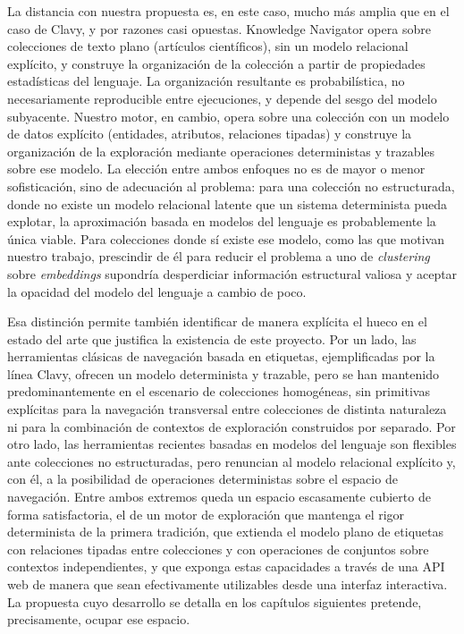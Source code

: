 La distancia con nuestra propuesta es, en este caso, mucho más amplia que en el caso de Clavy, y por
razones casi opuestas. Knowledge Navigator opera sobre colecciones de texto plano (artículos científicos),
sin un modelo relacional explícito, y construye la organización de la colección a partir de propiedades
estadísticas del lenguaje. La organización resultante es probabilística, no necesariamente reproducible
entre ejecuciones, y depende del sesgo del modelo subyacente. Nuestro motor, en cambio, opera sobre
una colección con un modelo de datos explícito (entidades, atributos, relaciones tipadas) y construye la
organización de la exploración mediante operaciones deterministas y trazables sobre ese modelo. La
elección entre ambos enfoques no es de mayor o menor sofisticación, sino de adecuación al problema:
para una colección no estructurada, donde no existe un modelo relacional latente que un sistema
determinista pueda explotar, la aproximación basada en modelos del lenguaje es probablemente la única
viable. Para colecciones donde sí existe ese modelo, como las que motivan nuestro trabajo, prescindir
de él para reducir el problema a uno de \textit{clustering} sobre \textit{embeddings} supondría desperdiciar
información estructural valiosa y aceptar la opacidad del modelo del lenguaje a cambio de poco.

Esa distinción permite también identificar de manera explícita el hueco en el estado del arte que
justifica la existencia de este proyecto. Por un lado, las herramientas clásicas de navegación basada en
etiquetas, ejemplificadas por la línea Clavy, ofrecen un modelo determinista y trazable, pero se han
mantenido predominantemente en el escenario de colecciones homogéneas, sin primitivas explícitas
para la navegación transversal entre colecciones de distinta naturaleza ni para la combinación de
contextos de exploración construidos por separado. Por otro lado, las herramientas recientes basadas
en modelos del lenguaje son flexibles ante colecciones no estructuradas, pero renuncian al modelo
relacional explícito y, con él, a la posibilidad de operaciones deterministas sobre el espacio de
navegación. Entre ambos extremos queda un espacio escasamente cubierto de forma
satisfactoria, el de un motor de exploración que mantenga el rigor determinista de la primera
tradición, que extienda el modelo plano de etiquetas con relaciones tipadas entre colecciones y con
operaciones de conjuntos sobre contextos independientes, y que exponga estas capacidades a través
de una API web de manera que sean efectivamente utilizables desde una interfaz interactiva. La
propuesta cuyo desarrollo se detalla en los capítulos siguientes pretende, precisamente, ocupar ese
espacio.
